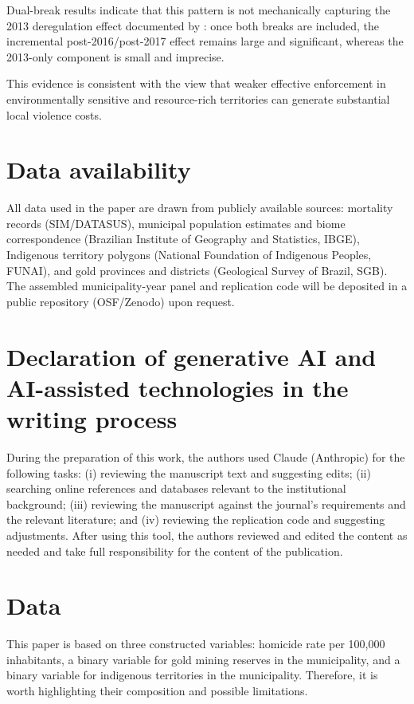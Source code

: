 \documentclass[preprint,12pt]{elsarticle}
\begin{document}
Dual-break results indicate that this pattern is not mechanically capturing the 2013 deregulation effect documented by \citet{pereira_pucci_2024}: once both breaks are included, the incremental post-2016/post-2017 effect remains large and significant, whereas the 2013-only component is small and imprecise.

This evidence is consistent with the view that weaker effective enforcement in environmentally sensitive and resource-rich territories can generate substantial local violence costs.

\section*{Data availability}
All data used in the paper are drawn from publicly available sources: mortality records (SIM/DATASUS), municipal population estimates and biome correspondence (Brazilian Institute of Geography and Statistics, IBGE), Indigenous territory polygons (National Foundation of Indigenous Peoples, FUNAI), and gold provinces and districts (Geological Survey of Brazil, SGB). The assembled municipality-year panel and replication code will be deposited in a public repository (OSF/Zenodo) upon request.

\section*{Declaration of generative AI and AI-assisted technologies in the writing process}

During the preparation of this work, the authors used Claude (Anthropic) for the following tasks: (i) reviewing the manuscript text and suggesting edits; (ii) searching online references and databases relevant to the institutional background; (iii) reviewing the manuscript against the journal's requirements and the relevant literature; and (iv) reviewing the replication code and suggesting adjustments. After using this tool, the authors reviewed and edited the content as needed and take full responsibility for the content of the publication.




\appendix

\section{Data} \label{ap:data}

This paper is based on three constructed variables: homicide rate per 100,000 inhabitants, a binary variable for gold mining reserves in the municipality, and a binary variable for indigenous territories in the municipality. Therefore, it is worth highlighting their composition and possible limitations.     
\end{document}
